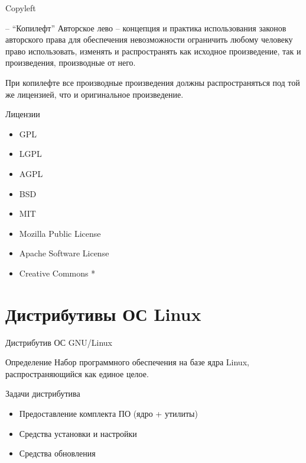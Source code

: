 \documentclass[ignorenonframetext, professionalfonts, hyperref={pdftex, unicode}]{beamer}
\begin{document}
\begin{frame}{Copyleft }

	\begin{block}{ \textcopyleft  -- ``Копилефт''}
	Авторское лево -- концепция и практика использования законов авторского права для обеспечения 
	невозможности ограничить любому человеку право использовать,  изменять и распространять как 
	исходное произведение,  так и произведения,  производные от него.
	\end{block}


	При копилефте все производные произведения должны распространяться под той же лицензией,
	что и оригинальное произведение.

\end{frame}


\begin{frame}{Лицензии}
	\begin{itemize}
		\item GPL
		\item LGPL
		\item AGPL
		\item BSD
		\item MIT
		\item Mozilla Public License
		\item Apache Software License
		\item Creative Commons *
	\end{itemize}
\end{frame}

\section{Дистрибутивы ОС Linux}

\begin{frame}{Дистрибутив ОС GNU/Linux}
	\begin{block}{ Определение}
		\pause
		Набор программного обеспечения на базе ядра Linux, распространяющийся как единое целое.
	\end{block}
\end{frame}


\begin{frame}{Задачи дистрибутива}
	\begin{itemize}
		\item Предоставление комплекта ПО (ядро + утилиты)
		\item Средства установки и настройки
		\item Средства обновления
	\end{itemize}
\end{frame}
\end{document}
